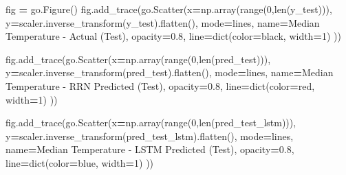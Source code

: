 \documentclass[
  a4paper,
  DIV=11,
  numbers=noendperiod]{scrreprt}
\newenvironment{Shaded}{\begin{snugshade}}{\end{snugshade}}
\newcommand{\BuiltInTok}[1]{#1}
\newcommand{\DecValTok}[1]{\textcolor[rgb]{0.00,0.00,0.81}{#1}}
\newcommand{\FloatTok}[1]{\textcolor[rgb]{0.00,0.00,0.81}{#1}}
\newcommand{\NormalTok}[1]{#1}
\newcommand{\OperatorTok}[1]{\textcolor[rgb]{0.81,0.36,0.00}{\textbf{#1}}}
\newcommand{\StringTok}[1]{\textcolor[rgb]{0.31,0.60,0.02}{#1}}
\begin{document}
\begin{Shaded}
\begin{Highlighting}[numbers=left,,]
\NormalTok{fig }\OperatorTok{=}\NormalTok{ go.Figure()}
\NormalTok{fig.add\_trace(go.Scatter(x}\OperatorTok{=}\NormalTok{np.array(}\BuiltInTok{range}\NormalTok{(}\DecValTok{0}\NormalTok{,}\BuiltInTok{len}\NormalTok{(y\_test))),}
\NormalTok{                         y}\OperatorTok{=}\NormalTok{scaler.inverse\_transform(y\_test).flatten(),}
\NormalTok{                         mode}\OperatorTok{=}\StringTok{\textquotesingle{}lines\textquotesingle{}}\NormalTok{,}
\NormalTok{                         name}\OperatorTok{=}\StringTok{\textquotesingle{}Median Temperature {-} Actual (Test)\textquotesingle{}}\NormalTok{,}
\NormalTok{                         opacity}\OperatorTok{=}\FloatTok{0.8}\NormalTok{,}
\NormalTok{                         line}\OperatorTok{=}\BuiltInTok{dict}\NormalTok{(color}\OperatorTok{=}\StringTok{\textquotesingle{}black\textquotesingle{}}\NormalTok{, width}\OperatorTok{=}\DecValTok{1}\NormalTok{)}
\NormalTok{                        ))}

\NormalTok{fig.add\_trace(go.Scatter(x}\OperatorTok{=}\NormalTok{np.array(}\BuiltInTok{range}\NormalTok{(}\DecValTok{0}\NormalTok{,}\BuiltInTok{len}\NormalTok{(pred\_test))),}
\NormalTok{                         y}\OperatorTok{=}\NormalTok{scaler.inverse\_transform(pred\_test).flatten(),}
\NormalTok{                         mode}\OperatorTok{=}\StringTok{\textquotesingle{}lines\textquotesingle{}}\NormalTok{,}
\NormalTok{                         name}\OperatorTok{=}\StringTok{\textquotesingle{}Median Temperature {-} RRN Predicted (Test)\textquotesingle{}}\NormalTok{,}
\NormalTok{                         opacity}\OperatorTok{=}\FloatTok{0.8}\NormalTok{,}
\NormalTok{                         line}\OperatorTok{=}\BuiltInTok{dict}\NormalTok{(color}\OperatorTok{=}\StringTok{\textquotesingle{}red\textquotesingle{}}\NormalTok{, width}\OperatorTok{=}\DecValTok{1}\NormalTok{)}
\NormalTok{                        ))}

\NormalTok{fig.add\_trace(go.Scatter(x}\OperatorTok{=}\NormalTok{np.array(}\BuiltInTok{range}\NormalTok{(}\DecValTok{0}\NormalTok{,}\BuiltInTok{len}\NormalTok{(pred\_test\_lstm))),}
\NormalTok{                         y}\OperatorTok{=}\NormalTok{scaler.inverse\_transform(pred\_test\_lstm).flatten(),}
\NormalTok{                         mode}\OperatorTok{=}\StringTok{\textquotesingle{}lines\textquotesingle{}}\NormalTok{,}
\NormalTok{                         name}\OperatorTok{=}\StringTok{\textquotesingle{}Median Temperature {-} LSTM Predicted (Test)\textquotesingle{}}\NormalTok{,}
\NormalTok{                         opacity}\OperatorTok{=}\FloatTok{0.8}\NormalTok{,}
\NormalTok{                         line}\OperatorTok{=}\BuiltInTok{dict}\NormalTok{(color}\OperatorTok{=}\StringTok{\textquotesingle{}blue\textquotesingle{}}\NormalTok{, width}\OperatorTok{=}\DecValTok{1}\NormalTok{)}
\NormalTok{                        ))}


\end{Highlighting}
\end{Shaded}
\end{document}
